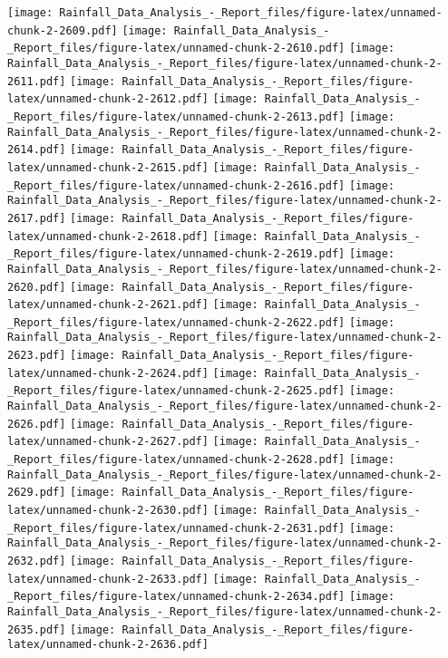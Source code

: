 \documentclass[
]{article}
\begin{document}
\texttt{[image: Rainfall\_Data\_Analysis\_-\_Report\_files/figure-latex/unnamed-chunk-2-2609.pdf]}
\texttt{[image: Rainfall\_Data\_Analysis\_-\_Report\_files/figure-latex/unnamed-chunk-2-2610.pdf]}
\texttt{[image: Rainfall\_Data\_Analysis\_-\_Report\_files/figure-latex/unnamed-chunk-2-2611.pdf]}
\texttt{[image: Rainfall\_Data\_Analysis\_-\_Report\_files/figure-latex/unnamed-chunk-2-2612.pdf]}
\texttt{[image: Rainfall\_Data\_Analysis\_-\_Report\_files/figure-latex/unnamed-chunk-2-2613.pdf]}
\texttt{[image: Rainfall\_Data\_Analysis\_-\_Report\_files/figure-latex/unnamed-chunk-2-2614.pdf]}
\texttt{[image: Rainfall\_Data\_Analysis\_-\_Report\_files/figure-latex/unnamed-chunk-2-2615.pdf]}
\texttt{[image: Rainfall\_Data\_Analysis\_-\_Report\_files/figure-latex/unnamed-chunk-2-2616.pdf]}
\texttt{[image: Rainfall\_Data\_Analysis\_-\_Report\_files/figure-latex/unnamed-chunk-2-2617.pdf]}
\texttt{[image: Rainfall\_Data\_Analysis\_-\_Report\_files/figure-latex/unnamed-chunk-2-2618.pdf]}
\texttt{[image: Rainfall\_Data\_Analysis\_-\_Report\_files/figure-latex/unnamed-chunk-2-2619.pdf]}
\texttt{[image: Rainfall\_Data\_Analysis\_-\_Report\_files/figure-latex/unnamed-chunk-2-2620.pdf]}
\texttt{[image: Rainfall\_Data\_Analysis\_-\_Report\_files/figure-latex/unnamed-chunk-2-2621.pdf]}
\texttt{[image: Rainfall\_Data\_Analysis\_-\_Report\_files/figure-latex/unnamed-chunk-2-2622.pdf]}
\texttt{[image: Rainfall\_Data\_Analysis\_-\_Report\_files/figure-latex/unnamed-chunk-2-2623.pdf]}
\texttt{[image: Rainfall\_Data\_Analysis\_-\_Report\_files/figure-latex/unnamed-chunk-2-2624.pdf]}
\texttt{[image: Rainfall\_Data\_Analysis\_-\_Report\_files/figure-latex/unnamed-chunk-2-2625.pdf]}
\texttt{[image: Rainfall\_Data\_Analysis\_-\_Report\_files/figure-latex/unnamed-chunk-2-2626.pdf]}
\texttt{[image: Rainfall\_Data\_Analysis\_-\_Report\_files/figure-latex/unnamed-chunk-2-2627.pdf]}
\texttt{[image: Rainfall\_Data\_Analysis\_-\_Report\_files/figure-latex/unnamed-chunk-2-2628.pdf]}
\texttt{[image: Rainfall\_Data\_Analysis\_-\_Report\_files/figure-latex/unnamed-chunk-2-2629.pdf]}
\texttt{[image: Rainfall\_Data\_Analysis\_-\_Report\_files/figure-latex/unnamed-chunk-2-2630.pdf]}
\texttt{[image: Rainfall\_Data\_Analysis\_-\_Report\_files/figure-latex/unnamed-chunk-2-2631.pdf]}
\texttt{[image: Rainfall\_Data\_Analysis\_-\_Report\_files/figure-latex/unnamed-chunk-2-2632.pdf]}
\texttt{[image: Rainfall\_Data\_Analysis\_-\_Report\_files/figure-latex/unnamed-chunk-2-2633.pdf]}
\texttt{[image: Rainfall\_Data\_Analysis\_-\_Report\_files/figure-latex/unnamed-chunk-2-2634.pdf]}
\texttt{[image: Rainfall\_Data\_Analysis\_-\_Report\_files/figure-latex/unnamed-chunk-2-2635.pdf]}
\texttt{[image: Rainfall\_Data\_Analysis\_-\_Report\_files/figure-latex/unnamed-chunk-2-2636.pdf]}
\end{document}
